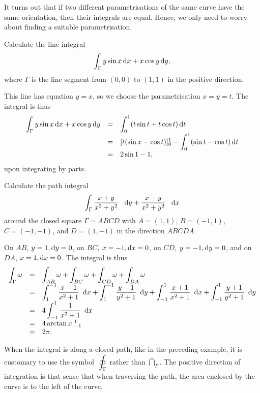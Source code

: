 \begin{rem}
It turns out that if two different parametrisations of the same
curve have the same orientation, then their integrals are equal.
Hence, we only need to worry about finding a suitable
parametrisation.
\end{rem}







\begin{exa}
 Calculate the line integral $$\dint _{\Gamma} y\sin x\d{x}+ x\cos y\d{y}  ,$$ where $\Gamma$ is the line
segment from $(0, 0)$ to $(1, 1)$ in the positive direction.
 \end{exa}
 \begin{solu} This line has equation $y = x$, so we choose the parametrisation $x = y = t$. The integral is thus
 $$\begin{array}{lll}
\dint _{\Gamma} y\sin x\d{x}+ x\cos y\d{y}  & = & \dint _0 ^1
(t\sin t  + t\cos t)\d t \\
& = &  [t(\sin x - \cos t)]_0 ^1 - \dint _0 ^1
(\sin t  - \cos t)\d t\\
 & = & 2\sin 1 - 1,
 \end{array}$$upon integrating by parts.






\end{solu}
\begin{exa}
 Calculate the path integral $$\dint _{\Gamma} \dfrac{x + y}{x^2 + y^2} \ \ \d{y} + \dfrac{x - y}{x^2 +
y^2}\ \ \d{x}$$around the closed square   $\Gamma = ABCD$ with $A
= (1, 1)$, $B = (-1, 1)$, $C = (-1, -1)$, and $D = (1, -1)$ in the
direction $ABCDA$.
 \end{exa}
 \begin{solu}  On $AB$, $y=1, \d{y} = 0$, on $BC$, $x = -1, \d{x} =
 0$, on $CD$, $y = -1, \d{y} = 0$, and on $DA$, $x = 1, \d{x} =
 0$. The integral is thus
 \renewcommand{\arraystretch}{2}
 $$\begin{array}{lll}
\dint _{\Gamma} \omega & = & \dint _{AB} \omega + \dint _{BC} \omega
+
\dint _{CD} \omega +  \dint _{DA} \omega \\
& = & \dint ^{-1} _1 \dfrac{x - 1}{x^2 + 1}\ \d{x}+  \dint ^{-1} _1
\dfrac{y - 1}{y^2 + 1}\ \d{y} +  \dint _{-1} ^1 \dfrac{x + 1}{x^2 +
1}\ \d{x}+  \dint _{-1} ^1 \dfrac{y + 1}{y^2 + 1}\
\d{y} \\
& = & 4 \dint _{-1} ^1 \dfrac{1}{x^2 + 1}\ \d{x}\\
& = & 4\arctan x|_{-1} ^1 \\ & = & 2\pi .
 \end{array}$$





 \end{solu}
 \begin{rem}
When the integral is along a closed path, like in the preceding
example, it is customary to use the symbol $\ \doint _\Gamma$
rather than $\dint_\Gamma$. The positive direction of integration
is that sense that when traversing the path, the area enclosed by
the curve is to the left of the curve.
\end{rem}

